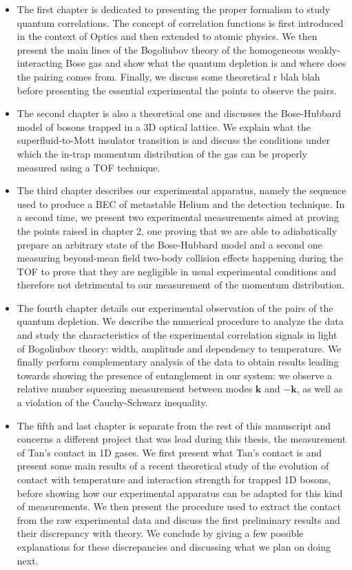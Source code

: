 \begin{itemize}
    \item The first chapter is dedicated to presenting the proper formalism to study quantum correlations. The concept of correlation functions is first introduced in the context of Optics and then extended to atomic physics. We then present the main lines of the Bogoliubov theory of the homogeneous weakly-interacting Bose gas and show what the quantum depletion is and where does the \kmk pairing comes from. Finally, we discuss some theoretical r blah blah before presenting the essential experimental the points to observe the \kmk pairs.
    \item The second chapter is also a theoretical one and discusses the Bose-Hubbard model of bosons trapped in a 3D optical lattice. We explain what the superfluid-to-Mott insulator transition is and discuss the conditions under which the in-trap momentum distribution of the gas can be properly measured using a TOF technique.
    \item The third chapter describes our experimental apparatus, namely the sequence used to produce a BEC of metastable Helium and the detection technique. In a second time, we present two experimental measurements aimed at proving the points raised in chapter 2, one proving that we are able to adiabatically prepare an arbitrary state of the Bose-Hubbard model and a second one measuring beyond-mean field two-body collision effects happening during the TOF to prove that they are negligible in usual experimental conditions and therefore not detrimental to our measurement of the momentum distribution. 
    \item The fourth chapter details our experimental observation of the \kmk pairs of the quantum depletion. We describe the numerical procedure to analyze the data and study the characteristics of the experimental correlation signals in light of Bogoliubov theory: width, amplitude and dependency to temperature. We finally perform complementary analysis of the data to obtain results leading towards showing the presence of entanglement in our system: we observe a relative number squeezing measurement between modes $\bm{k}$ and $-\bm{k}$, as well as a violation of the Cauchy-Schwarz inequality.
    \item The fifth and last chapter is separate from the rest of this manuscript and concerns a different project that was lead during this thesis, the measurement of Tan's contact in 1D gases. We first present what Tan's contact is and present some main results of a recent theoretical study of the evolution of contact with temperature and interaction strength for trapped 1D bosons, before showing how our experimental apparatus can be adapted for this kind of measurements. We then present the procedure used to extract the contact from the raw experimental data and discuss the first preliminary results and their discrepancy with theory. We conclude by giving a few possible explanations for these discrepancies and discussing what we plan on doing next.
\end{itemize}









